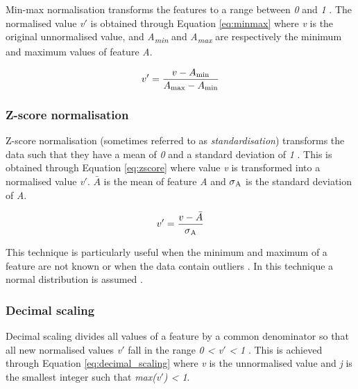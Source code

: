 \documentclass{article}[paper=a4,pagesize=auto,10pt]
\begin{document}
Min-max normalisation transforms the features to a range between \textit{0} and \textit{1} \cite{mohamad2013standardization}. The normalised value \textit{v}$'$ is obtained through Equation \ref{eq:minmax} where \textit{v} is the original unnormalised value, and \textit{A\textsubscript{min}} and \textit{A\textsubscript{max}} are respectively the minimum and maximum values of feature \textit{A}.

\begin{equation}\label{eq:minmax}
	v' = \frac{v - A\textsubscript{min}}{A\textsubscript{max}-A\textsubscript{min}}
\end{equation}\smallskip

\subsubsection{Z-score normalisation} \label{Z-score normalisation}

Z-score normalisation (sometimes referred to as \textit{standardisation}) transforms the data such that they have a mean of \textit{0} and a standard deviation of \textit{1} \cite{mohamad2013standardization,garcia2015data}. This is obtained through Equation \ref{eq:zscore} where value \textit{v} is transformed into a normalised value \textit{v}$'$. $\bar{A}$ is the mean of feature \textit{A} and $\sigma\textsubscript{A}$ is the standard deviation of \textit{A}.  

\begin{equation}\label{eq:zscore}
	v' = \frac{v - \bar{A}}{\sigma\textsubscript{A}}
\end{equation}\smallskip

This technique is particularly useful when the minimum and maximum of a feature are not known or when the data contain outliers \cite{garcia2015data}. In this technique a normal distribution is assumed \cite{stolcke2008nonparametric}.\medskip

\subsubsection{Decimal scaling} \label{Decimal scaling}

Decimal scaling divides all values of a feature by a common denominator so that all new normalised values \textit{v}$'$ fall in the range \textit{0 < v}$'$\textit{ < 1} \cite{han2011data,garcia2015data}.  This is achieved through Equation \ref{eq:decimal_scaling} where \textit{v} is the unnormalised value and \textit{j} is the smallest integer such that \textit{max(v}$'$\textit{) < 1}.
\end{document}
